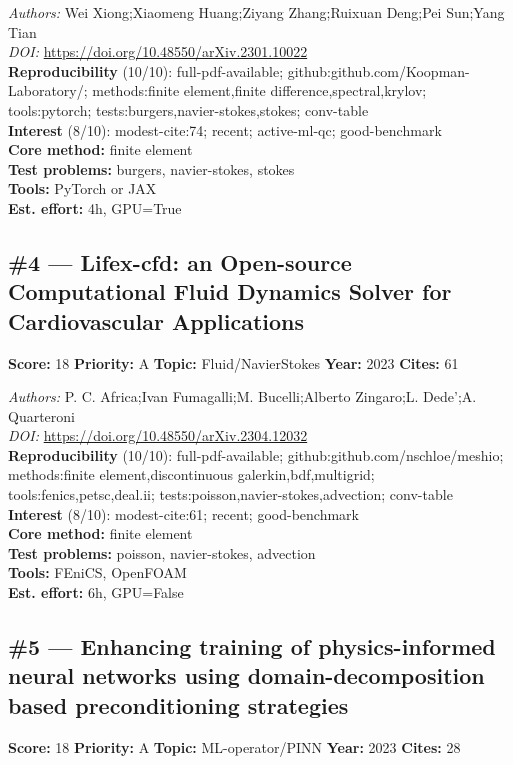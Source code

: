 \documentclass[10pt,letterpaper]{article}
\begin{document}
\textit{Authors:} Wei Xiong;Xiaomeng Huang;Ziyang Zhang;Ruixuan Deng;Pei Sun;Yang Tian \\ 
\textit{DOI:} \url{https://doi.org/10.48550/arXiv.2301.10022} \\ 
\textbf{Reproducibility } (10/10): full-pdf-available; github:github.com/Koopman-Laboratory/; methods:finite element,finite difference,spectral,krylov; tools:pytorch; tests:burgers,navier-stokes,stokes; conv-table \\ 
\textbf{Interest } (8/10): modest-cite:74; recent; active-ml-qc; good-benchmark \\ 
\textbf{Core method:} finite element \\ 
\textbf{Test problems:} burgers, navier-stokes, stokes \\ 
\textbf{Tools:} PyTorch or JAX \\ 
\textbf{Est. effort:} 4h, GPU=True \\ 

\subsection*{\#4 — Lifex-cfd: an Open-source Computational Fluid Dynamics Solver for Cardiovascular Applications}
\textbf{Score:} 18 \quad \textbf{Priority:} A \quad \textbf{Topic:} Fluid/NavierStokes \quad \textbf{Year:} 2023 \quad \textbf{Cites:} 61

\textit{Authors:} P. C. Africa;Ivan Fumagalli;M. Bucelli;Alberto Zingaro;L. Dede’;A. Quarteroni \\ 
\textit{DOI:} \url{https://doi.org/10.48550/arXiv.2304.12032} \\ 
\textbf{Reproducibility } (10/10): full-pdf-available; github:github.com/nschloe/meshio; methods:finite element,discontinuous galerkin,bdf,multigrid; tools:fenics,petsc,deal.ii; tests:poisson,navier-stokes,advection; conv-table \\ 
\textbf{Interest } (8/10): modest-cite:61; recent; good-benchmark \\ 
\textbf{Core method:} finite element \\ 
\textbf{Test problems:} poisson, navier-stokes, advection \\ 
\textbf{Tools:} FEniCS, OpenFOAM \\ 
\textbf{Est. effort:} 6h, GPU=False \\ 

\subsection*{\#5 — Enhancing training of physics-informed neural networks using domain-decomposition based preconditioning strategies}
\textbf{Score:} 18 \quad \textbf{Priority:} A \quad \textbf{Topic:} ML-operator/PINN \quad \textbf{Year:} 2023 \quad \textbf{Cites:} 28
\end{document}

